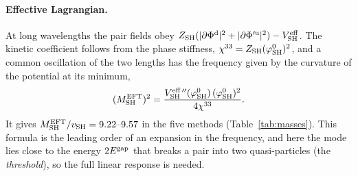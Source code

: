 \documentclass[aps,prd,twocolumn,superscriptaddress,nofootinbib,floatfix,longbibliography]{revtex4-2}
\newcommand{\SH}{{\rm SH}}
\begin{document}
\paragraph*{Effective Lagrangian.}
At long wavelengths the pair fields obey $Z_\SH(|\partial\Phi^{\rm d}|^2+|\partial\Phi'^{\rm u}|^2)-V^{\rm eff}_\SH$. The
kinetic coefficient follows from the phase stiffness, $\chi^{33}=Z_\SH(\varphi^0_\SH)^2$, and a common oscillation of
the two lengths has the frequency given by the curvature of the potential at its minimum,
\begin{equation}
(M^{\rm EFT}_\SH)^2=\frac{V^{\rm eff\,\prime\prime}_\SH(\varphi^0_\SH)\,(\varphi^0_\SH)^2}{4\chi^{33}} .
\label{eq:MEFT}
\end{equation}
It gives $M^{\rm EFT}_\SH/v_\SH=\ensuremath{9.22}\mbox{--}\ensuremath{9.57}$ in the five methods (Table~\ref{tab:masses}). This formula is the
leading order of an expansion in the frequency, and here the mode lies close to the energy $2E^{\rm gap}$ that breaks a
pair into two quasi-particles (the \emph{threshold}), so the full linear response is needed.
\end{document}
